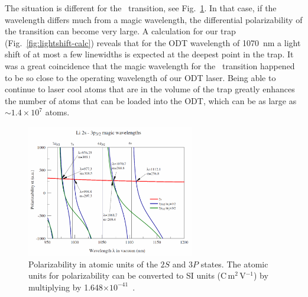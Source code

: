 The situation is different for the \uv\ transition, see
Fig.~\ref{fig:safronova3p}.  In that case, if the wavelength differs much from
a magic wavelength, the differential polarizability of the transition can
become very large.  A calculation for our trap (Fig.~\ref{fig:lightshift-calc})
reveals that for the ODT wavelength of 1070~nm a light shift of at most a few
linewidths is expected at the deepest point in the trap.   It was a great
coincidence that the magic wavelength for the \uv\ transition happened to be so
close to the operating wavelength of our ODT laser.   Being able to continue to
laser cool atoms that are in the volume of the trap greatly enhances the number
of atoms that can be loaded into the ODT,  which can be as large as $\sim
1.4\times 10^{7}$ atoms.  
\begin{figure}
\centering
\includegraphics[width=0.65\textwidth]{../masters-figures/safronova/2s3p.pdf}
\caption[Polarizabilities for 1070 nm light]{\small Polarizability in atomic
units of the $2S$ and $3P$ states.  The atomic units for polarizability can be
converted to SI units (C\,m$^{2}$\,V$^{-1}$) by multiplying by
1.648$\times10^{-41}$~\cite{Safronova2006,Safronova2010}.}
\label{fig:safronova3p} 
\end{figure} 


